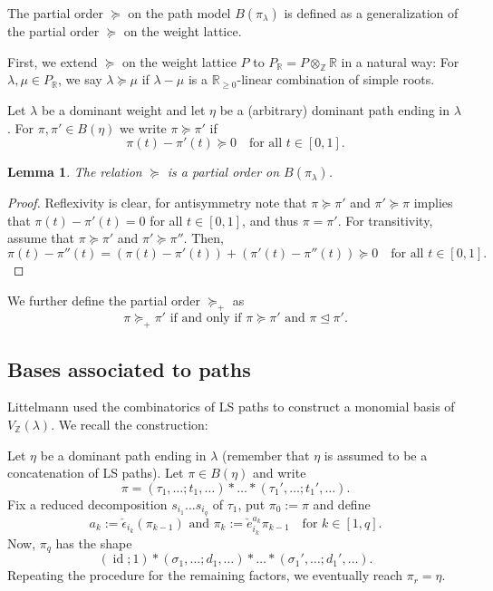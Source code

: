 \documentclass[final]{amsart}
\theoremstyle{plain}
\newtheorem{lemma}[corollary]{Lemma}
\theoremstyle{definition}
\newcommand{\bbR}{\mathbb R}
\newcommand{\bbZ}{\mathbb Z}
\newcommand{\ce}{\check{e}}
\newcommand{\cepsilon}{\check{\epsilon}}
\DeclareMathOperator{\id}{id}
\begin{document}
The partial order $\succeq$ on the path model $B(\pi_\lambda)$ is defined as a generalization of the partial order $\succeq$ on the weight lattice.

First, we extend $\succeq$ on the weight lattice $P$ to $P_\bbR = P \otimes_\bbZ \bbR$ in a natural way: For $\lambda, \mu \in P_\bbR$, we say $\lambda \succeq \mu$ if $\lambda - \mu$ is a $\bbR_{\ge0}$-linear combination of simple roots.

Let $\lambda$ be a dominant weight and let $\eta$ be a (arbitrary) dominant path ending in $\lambda$.
For $\pi, \pi' \in B(\eta)$ we write $\pi \succeq \pi'$ if
\begin{equation}
    \label{equation:ls-path-order-succeq}
    \pi(t) - \pi'(t) \succeq 0 \quad \text{for all } t \in [0,1].
\end{equation}

\begin{lemma}
    \label{lemma:partial-order-path-model}
    The relation $\succeq$ is a partial order on $B(\pi_\lambda)$.
\end{lemma}
\begin{proof}
    Reflexivity is clear, for antisymmetry note that $\pi \succeq \pi'$ and $\pi' \succeq \pi$ implies that $\pi(t) - \pi'(t) = 0$ for all $t\in [0, 1]$, and thus $\pi = \pi'$.
    For transitivity, assume that $\pi \succeq \pi'$ and $\pi' \succeq \pi''$.
    Then,
    \[
        \pi(t) - \pi''(t) = (\pi(t) - \pi'(t)) + (\pi'(t) - \pi''(t)) \succeq 0 \quad \text{for all } t \in [0,1].
    \]
\end{proof}

We further define the partial order $\succeq_+$ as
\begin{equation}
    \label{equation:path-order-succeq-plus}
    \pi \succeq_+ \pi' \text{ if and only if } \pi \succeq \pi' \text{ and } \pi \trianglelefteq \pi'.
\end{equation}

\subsection{Bases associated to paths}
\label{section:bases-associated-to-paths}
Littelmann \cite{Littelmann:ContractingModules-StandardMonomialTheory} used the combinatorics of LS paths to construct a monomial basis of $V_\bbZ(\lambda)$.
We recall the construction:

Let $\eta$ be a dominant path ending in $\lambda$ (remember that $\eta$ is assumed to be a concatenation of LS paths).
Let $\pi \in B(\eta)$ and write
\[
    \pi = (\tau_1, \dots; t_1, \dots) * \dots * (\tau_1', \dots; t_1', \dots).
\]
Fix a reduced decomposition $s_{i_1}\dots s_{i_q}$ of $\tau_1$, put $\pi_0 := \pi$ and define
\[
    a_k := \cepsilon_{i_k}(\pi_{k-1}) \text{ and } \pi_k := \ce_{i_k}^{a_k}\pi_{k-1} \quad \text{for } k \in [1, q].
\]
Now, $\pi_q$ has the shape
\[
    (\id; 1) * (\sigma_1, \dots; d_1, \dots) * \dots * (\sigma_1', \dots; d_1', \dots).
\]
Repeating the procedure for the remaining factors, we eventually reach $\pi_r = \eta$.
\end{document}
